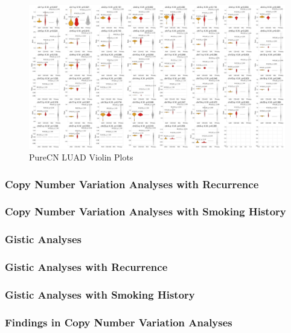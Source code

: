 \documentclass[11pt,a4paper,onecolumn,oneside]{report}
\begin{document}
                \begin{figure}[p]
                    \centering
                    \includegraphics[width=\linewidth]{figures/PureCN/BWA-violin-ADC.pdf}
                    \caption{PureCN LUAD Violin Plots}
                    \label{fig:PureCN-ADC-violin}
                \end{figure}

            \subsubsection{Copy Number Variation Analyses with Recurrence}

            \subsubsection{Copy Number Variation Analyses with Smoking History}

            \subsubsection{Gistic Analyses}

            \subsubsection{Gistic Analyses with Recurrence}

            \subsubsection{Gistic Analyses with Smoking History}

            \subsubsection{Findings in Copy Number Variation Analyses}
\end{document}
